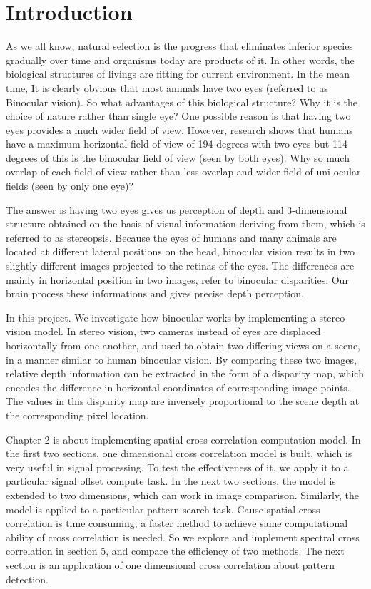\chapter{Introduction}\label{part:into}

As we all know, natural selection is the progress that eliminates inferior species gradually over time and organisms today are products of it. In other words, the biological structures of livings are fitting for current environment. In the mean time, It is clearly obvious that most animals have two eyes (referred to as Binocular vision). So what advantages of this biological structure? Why it is the choice of nature rather than single eye? One possible reason is that having two eyes provides a much wider field of view. However, research shows that humans have a maximum horizontal field of view of 194 degrees with two eyes but 114 degrees of this is the binocular field of view (seen by both eyes)\cite{Howard1995Binocular}. Why so much overlap of each field of view rather than less overlap and wider field of uni-ocular fields (seen by only one eye)? 

The answer is having two eyes gives us perception of depth and 3-dimensional structure obtained on the basis of visual information deriving from them, which is referred to as stereopsis. Because the eyes of humans and many animals are located at different lateral positions on the head, binocular vision results in two slightly different images projected to the retinas of the eyes. The differences are mainly in horizontal position in two images, refer to binocular disparities. Our brain process these informations and gives precise depth perception.

In this project. We investigate how binocular works by implementing a stereo vision model. In stereo vision, two cameras instead of eyes are displaced horizontally from one another, and used to obtain two differing views on a scene, in a manner similar to human binocular vision. By comparing these two images, relative depth information can be extracted in the form of a disparity map, which encodes the difference in horizontal coordinates of corresponding image points. The values in this disparity map are inversely proportional to the scene depth at the corresponding pixel location.

Chapter 2 is about implementing spatial cross correlation computation model. In the first two sections, one dimensional cross correlation model is built, which is very useful in signal processing.  To test the effectiveness of it, we apply it to a particular signal offset compute task. In the next two sections, the model is extended to two dimensions, which can work in image comparison. Similarly, the model is applied to a particular pattern search task. Cause spatial cross correlation is time consuming,  a faster method to achieve same computational ability of cross correlation is needed. So we explore and implement spectral cross correlation in section 5, and compare the efficiency of two methods. The next section is an application of one dimensional cross correlation about pattern detection. 

